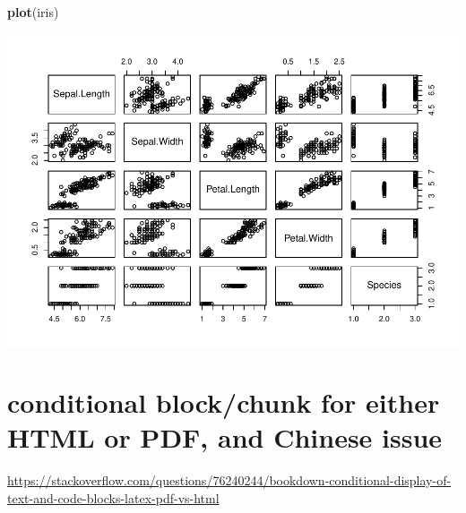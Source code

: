 \documentclass[
]{book}
\newenvironment{Shaded}{\begin{snugshade}}{\end{snugshade}}
\newcommand{\FunctionTok}[1]{\textcolor[rgb]{0.13,0.29,0.53}{\textbf{#1}}}
\newcommand{\NormalTok}[1]{#1}
\theoremstyle{definition}
\theoremstyle{definition}
\theoremstyle{definition}
\theoremstyle{definition}
\theoremstyle{remark}
\begin{document}
\begin{Shaded}
\begin{Highlighting}[]
\FunctionTok{plot}\NormalTok{(iris)}
\end{Highlighting}
\end{Shaded}

\includegraphics{202401280001-test_files/figure-latex/unnamed-chunk-41-1.pdf}

\hypertarget{conditional-blockchunk-for-either-html-or-pdf-and-chinese-issue}{%
\section{conditional block/chunk for either HTML or PDF, and Chinese issue}\label{conditional-blockchunk-for-either-html-or-pdf-and-chinese-issue}}

\url{https://stackoverflow.com/questions/76240244/bookdown-conditional-display-of-text-and-code-blocks-latex-pdf-vs-html}
\end{document}
